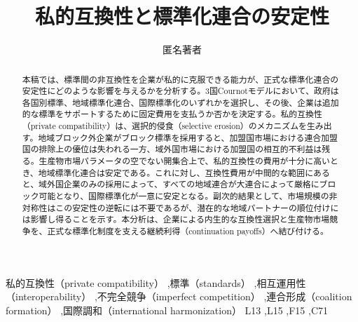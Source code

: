 \documentclass[review,authoryear]{elsarticle}
\begin{document}
\begin{frontmatter}

\title{私的互換性と標準化連合の安定性}

\author{匿名著者}

\begin{abstract}
本稿では、標準間の非互換性を企業が私的に克服できる能力が、正式な標準化連合の安定性にどのような影響を与えるかを分析する。3国Cournotモデルにおいて、政府は各国別標準、地域標準化連合、国際標準化のいずれかを選択し、その後、企業は追加的な標準をサポートするために固定費用を支払うか否かを決定する。私的互換性（private compatibility）は、選択的侵食（selective erosion）のメカニズムを生み出す。地域ブロック外企業がブロック標準を採用すると、加盟国市場における連合加盟国の排除上の優位は失われる一方、域外国市場における加盟国の相互的不利益は残る。生産物市場パラメータの空でない開集合上で、私的互換性の費用が十分に高いとき、地域標準化連合は安定である。これに対し、互換性費用が中間的な範囲にあると、域外国企業のみの採用によって、すべての地域連合が大連合によって厳格にブロック可能となり、国際標準化が一意に安定となる。副次的結果として、市場規模の非対称性はこの安定性の逆転には不要であるが、潜在的な地域パートナーの順位付けには影響し得ることを示す。本分析は、企業による内生的な互換性選択と生産物市場競争を、正式な標準化制度を支える継続利得（continuation payoffs）へ結び付ける。
\end{abstract}

\begin{keyword}
私的互換性（private compatibility） \sep 標準（standards） \sep 相互運用性（interoperability） \sep 不完全競争（imperfect competition） \sep 連合形成（coalition formation） \sep 国際調和（international harmonization）
\JEL L13 \sep L15 \sep F15 \sep C71
\end{keyword}

\end{frontmatter}












\appendix










\end{document}
